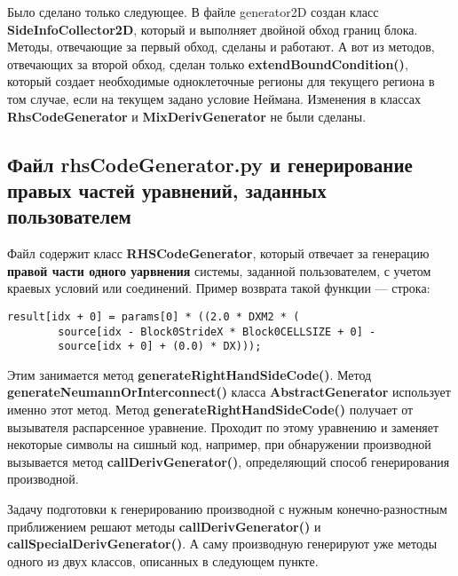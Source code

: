 \documentclass[a4paper]{article}
\begin{document}
Было сделано только следующее. В файле generator2D создан класс {\bf SideInfoCollector2D}, который и выполняет двойной обход границ блока. Методы, отвечающие за первый обход, сделаны и работают. А вот из методов, отвечающих за второй обход, сделан только {\bf extendBoundCondition()}, который создает необходимые одноклеточные регионы для текущего региона в том случае, если на текущем задано условие Неймана. Изменения в классах {\bf RhsCodeGenerator} и {\bf MixDerivGenerator} не были сделаны.

\newpage
\subsection{\Large Файл rhsCodeGenerator.py и генерирование правых частей уравнений, заданных пользователем}
Файл содержит класс {\bf RHSCodeGenerator}, который отвечает за ге\-не\-ра\-цию {\bf правой части одного уарвнения} системы, заданной пользователем, с учетом краевых условий или соединений. Пример возврата такой функ\-ции --- строка:
\begin{verbatim}
result[idx + 0] = params[0] * ((2.0 * DXM2 * (
        source[idx - Block0StrideX * Block0CELLSIZE + 0] - 
        source[idx + 0] + (0.0) * DX)));
\end{verbatim}

Этим занимается метод {\bf generateRightHandSideCode()}. Метод {\bf ge\-ne\-rate\-Neu\-mann\-Or\-In\-ter\-con\-nect()} класса {\bf AbstractGenerator} использует именно этот метод. Метод {\bf ge\-ne\-rate\-Right\-Hand\-Side\-Co\-de()} получает от вызывателя распарсенное уравнение. Проходит по этому уравнению и заменяет некоторые символы на сишный код, например, при обнаружении производной вызывается метод {\bf callDerivGenerator()}, определяющий способ генерирования производной.

Задачу подготовки к генерированию производной с нужным конечно-разностным приближением решают методы {\bf callDerivGenerator()} и {\bf call\-Spe\-ci\-al\-De\-riv\-Ge\-ne\-ra\-tor()}. А саму производную генерируют уже методы одного из двух классов, описанных в следующем пункте.
\end{document}
